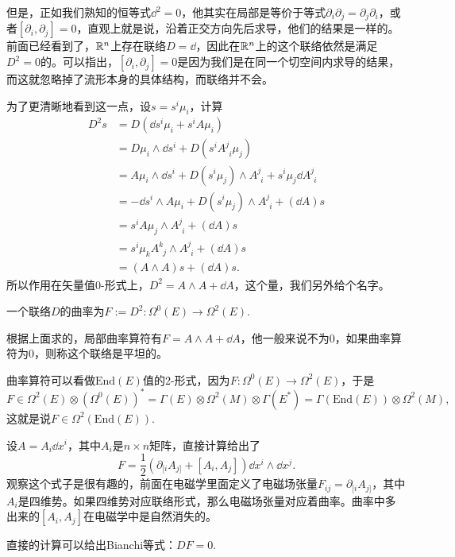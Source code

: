但是，正如我们熟知的恒等式$\dd^2=0$，他其实在局部是等价于等式$\partial_i \partial_j=\partial_j \partial_i$，或者$[\partial_i,\partial_j]=0$，直观上就是说，沿着正交方向先后求导，他们的结果是一样的。前面已经看到了，$\mathbb{R}^n$上存在联络$D=\dd$，因此在$\mathbb{R}^n$上的这个联络依然是满足$D^2=0$的。可以指出，$[\partial_i,\partial_j]=0$是因为我们是在同一个切空间内求导的结果，而这就忽略掉了流形本身的具体结构，而联络并不会。

为了更清晰地看到这一点，设$s=s^i\mu_i$，计算
\begin{align*}
	D^2 s&=D(\dd s^i \mu_i+s^iA\mu_i)\\
	&=D\mu_i\wedge \dd s^i+D(s^i A^{j}_{\phantom{j}i}\mu_j)\\
	&=A\mu_i\wedge \dd s^i+D(s^i\mu_j)\wedge A^{j}_{\phantom{j}i}+s^i\mu_j\dd A^{j}_{\phantom{j}i}\\
	&=-\dd s^i\wedge A\mu_i+D(s^i\mu_j)\wedge A^{j}_{\phantom{j}i}+(\dd A)s\\
	&=s^i A\mu_j\wedge A^{j}_{\phantom{j}i}+(\dd A)s\\
	&=s^i \mu_k A^{k}_{\phantom{k}j}\wedge A^{j}_{\phantom{j}i}+(\dd A)s\\
	&=(A\wedge A)s+(\dd A)s.
\end{align*}
所以作用在矢量值0-形式上，$D^2=A\wedge A+\dd A$，这个量，我们另外给个名字。

\para 一个联络$D$的曲率为$F:=D^2:\Omega^0(E)\to \Omega^2(E)$.

根据上面求的，局部曲率算符有$F=A\wedge A+\dd A$，他一般来说不为0，如果曲率算符为0，则称这个联络是平坦的。

曲率算符可以看做$\mathrm{End}(E)$值的2-形式，因为$F:\Omega^0(E)\to \Omega^2(E)$，于是
\[
	F\in \Omega^2(E)\otimes (\Omega^0(E))^*=\Gamma(E)\otimes \Omega^2(M)\otimes \Gamma(E^*)=\Gamma(\mathrm{End}(E))\otimes \Omega^2(M),
\]
这就是说$F\in \Omega^2(\mathrm{End}(E))$.

设$A=A_i\dd x^i$，其中$A_i$是$n\times n$矩阵，直接计算给出了
\[
	F=\frac{1}{2}\left(\partial_{[i}A_{j]}+[A_i,A_j]\right)\dd x^i\wedge \dd x^j.
\]
观察这个式子是很有趣的，前面在电磁学里面定义了电磁场张量$F_{ij}=\partial_{[i}A_{j]}$，其中$A_i$是四维势。如果四维势对应联络形式，那么电磁场张量对应着曲率。曲率中多出来的$[A_i,A_j]$在电磁学中是自然消失的。

\para 直接的计算可以给出Bianchi等式：$DF=0$.

